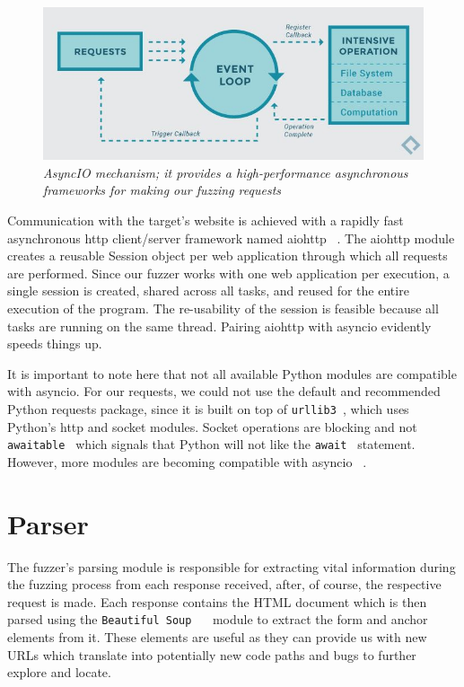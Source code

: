 \begin{figure}[ht]
 \centering
 \captionsetup{justification=centering}
 \includegraphics[width=\linewidth]{figures/asyncio_process.jpg}
 \caption[AsyncIO mechanism]
 {\textit{AsyncIO mechanism; it provides a high-performance asynchronous frameworks for making our fuzzing requests} ~\cite{asyncio_image_source}}
 \label{fig:asyncio_image_source}
\end{figure}

Communication with the target's website is achieved with a rapidly fast asynchronous http client/server framework named aiohttp ~\cite{aiohttp}. The aiohttp module creates a reusable Session object per web application through which all requests are performed. Since our fuzzer works with one web application per execution, a single session is created, shared across all tasks, and reused for the entire execution of the program. The re-usability of the session is feasible because all tasks are running on the same thread. Pairing aiohttp with asyncio evidently speeds things up.

It is important to note here that not all available Python modules are compatible with asyncio. For our requests, we could not use the default and recommended Python requests package, since it is built on top of {\tt urllib3 }, which uses Python's http and socket modules. Socket operations are blocking and not  {\tt awaitable } which signals that Python will not like the {\tt await } statement. However, more modules are becoming compatible with asyncio ~\cite{aiohttp}.

\section{Parser}
The fuzzer's parsing module is responsible for extracting vital information during the fuzzing process from each response received, after, of course, the respective request is made. Each response contains the HTML document which is then parsed using the {\tt  Beautiful Soup } ~\cite{beautiful_soup} module to extract the form and anchor elements from it. These elements are useful as they can provide us with new URLs which translate into potentially new code paths and bugs to further explore and locate. 

